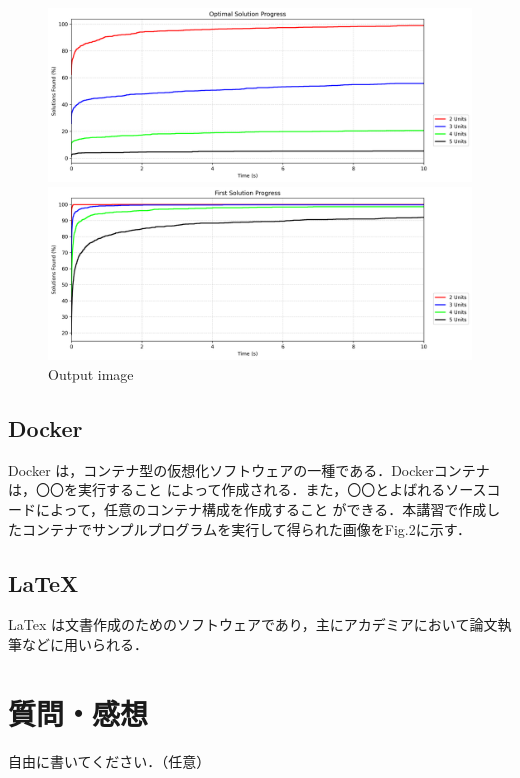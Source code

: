 \documentclass[11pt, a4paper]{jarticle}
\begin{document}
\begin{figure}[tb]
    \centering
    \begin{minipage}{0.45\textwidth}
        \centering
        \includegraphics[width=\linewidth]{solution_progress_final.png}
    \end{minipage}
    \hfill
    \begin{minipage}{0.45\textwidth}
        \centering
        \includegraphics[width=\linewidth]{solution_progress_first.png}
    \end{minipage}
    \caption{Output image}
\end{figure}

\subsection{Docker}
Docker は，コンテナ型の仮想化ソフトウェアの一種である．Dockerコンテナは，〇〇を実行すること
によって作成される．また，〇〇とよばれるソースコードによって，任意のコンテナ構成を作成すること
ができる．本講習で作成したコンテナでサンプルプログラムを実行して得られた画像をFig.2に示す．

\subsection{LaTeX}
LaTex は文書作成のためのソフトウェアであり，主にアカデミアにおいて論文執筆などに用いられる．

\section{質問・感想}
自由に書いてください．（任意）

\printbibliography
\end{document}
